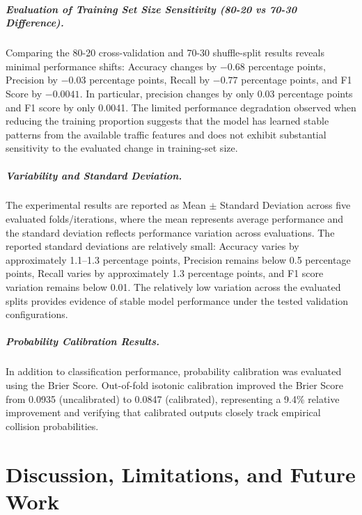 \documentclass[12pt,a4paper]{report}
\begin{document}
\paragraph{Evaluation of Training Set Size Sensitivity (80-20 vs 70-30 Difference).}
Comparing the 80-20 cross-validation and 70-30 shuffle-split results reveals minimal performance shifts: Accuracy changes by $-0.68$ percentage points, Precision by $-0.03$ percentage points, Recall by $-0.77$ percentage points, and F1 Score by $-0.0041$. In particular, precision changes by only 0.03 percentage points and F1 score by only 0.0041. The limited performance degradation observed when reducing the training proportion suggests that the model has learned stable patterns from the available traffic features and does not exhibit substantial sensitivity to the evaluated change in training-set size.

\paragraph{Variability and Standard Deviation.}
The experimental results are reported as Mean $\pm$ Standard Deviation across five evaluated folds/iterations, where the mean represents average performance and the standard deviation reflects performance variation across evaluations. The reported standard deviations are relatively small: Accuracy varies by approximately 1.1--1.3 percentage points, Precision remains below 0.5 percentage points, Recall varies by approximately 1.3 percentage points, and F1 score variation remains below 0.01. The relatively low variation across the evaluated splits provides evidence of stable model performance under the tested validation configurations.

\paragraph{Probability Calibration Results.}
In addition to classification performance, probability calibration was evaluated using the Brier Score. Out-of-fold isotonic calibration improved the Brier Score from 0.0935 (uncalibrated) to 0.0847 (calibrated), representing a 9.4\% relative improvement and verifying that calibrated outputs closely track empirical collision probabilities.
\clearpage\thispagestyle{empty}\newpage

\chapter{Discussion, Limitations, and Future Work}
\label{chap:discussion}
\end{document}
